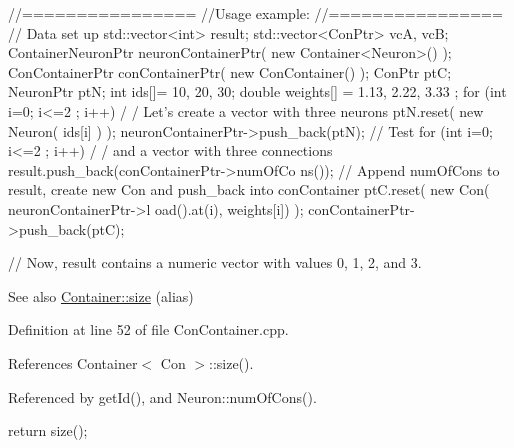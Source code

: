 \begin{DoxyCode}
  //================
  //Usage example:
  //================
        // Data set up
                                std::vector<int> result;
                                std::vector<ConPtr> vcA, vcB;
                                ContainerNeuronPtr      neuronContainerPtr( new 
      Container<Neuron>() );
                                ConContainerPtr conContainerPtr( new 
      ConContainer() );
                                ConPtr  ptC;
                                NeuronPtr ptN;
                                int ids[]= {10, 20, 30};
                                double weights[] = {1.13, 2.22, 3.33 };
                                for (int i=0; i<=2 ; i++) {                             /
      / Let's create a vector with three neurons
                                        ptN.reset( new Neuron( ids[i] ) );
                                        neuronContainerPtr->push_back(ptN);
                                }
        // Test
                                for (int i=0; i<=2 ; i++) {                             /
      / and a vector with three connections
                                        result.push_back(conContainerPtr->numOfCo
      ns());          // Append numOfCons to result, create new Con and push_back into 
      conContainer
                                        ptC.reset( new Con( neuronContainerPtr->l
      oad().at(i), weights[i]) );
                                        conContainerPtr->push_back(ptC);
                                }

        // Now, result contains a numeric vector with values 0, 1, 2, and 3.
\end{DoxyCode}


\begin{DoxySeeAlso}{See also}
\hyperlink{class_container_a842c3d9eca81b78b59112fde9707b091}{Container::size} (alias) 
\end{DoxySeeAlso}


Definition at line 52 of file ConContainer.cpp.



References Container$<$ Con $>$::size().



Referenced by getId(), and Neuron::numOfCons().


\begin{DoxyCode}
{
  return size();
}
\end{DoxyCode}


